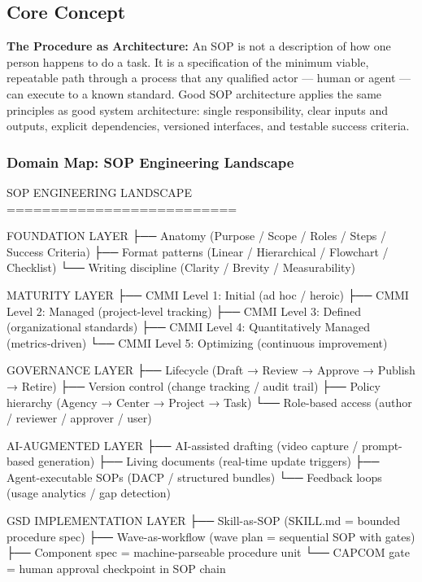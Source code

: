 \documentclass[11pt,letterpaper]{article}
\begin{document}
\subsection{Core Concept}

\textbf{The Procedure as Architecture:} An SOP is not a description of how one person happens to do a task. It is a specification of the minimum viable, repeatable path through a process that any qualified actor --- human or agent --- can execute to a known standard. Good SOP architecture applies the same principles as good system architecture: single responsibility, clear inputs and outputs, explicit dependencies, versioned interfaces, and testable success criteria.

\subsubsection{Domain Map: SOP Engineering Landscape}

\begin{asciibox}
  SOP ENGINEERING LANDSCAPE
  ==========================

  FOUNDATION LAYER
  ├── Anatomy (Purpose / Scope / Roles / Steps / Success Criteria)
  ├── Format patterns (Linear / Hierarchical / Flowchart / Checklist)
  └── Writing discipline (Clarity / Brevity / Measurability)

  MATURITY LAYER
  ├── CMMI Level 1: Initial (ad hoc / heroic)
  ├── CMMI Level 2: Managed (project-level tracking)
  ├── CMMI Level 3: Defined (organizational standards)
  ├── CMMI Level 4: Quantitatively Managed (metrics-driven)
  └── CMMI Level 5: Optimizing (continuous improvement)

  GOVERNANCE LAYER
  ├── Lifecycle (Draft → Review → Approve → Publish → Retire)
  ├── Version control (change tracking / audit trail)
  ├── Policy hierarchy (Agency → Center → Project → Task)
  └── Role-based access (author / reviewer / approver / user)

  AI-AUGMENTED LAYER
  ├── AI-assisted drafting (video capture / prompt-based generation)
  ├── Living documents (real-time update triggers)
  ├── Agent-executable SOPs (DACP / structured bundles)
  └── Feedback loops (usage analytics / gap detection)

  GSD IMPLEMENTATION LAYER
  ├── Skill-as-SOP (SKILL.md = bounded procedure spec)
  ├── Wave-as-workflow (wave plan = sequential SOP with gates)
  ├── Component spec = machine-parseable procedure unit
  └── CAPCOM gate = human approval checkpoint in SOP chain
\end{asciibox}
\end{document}
